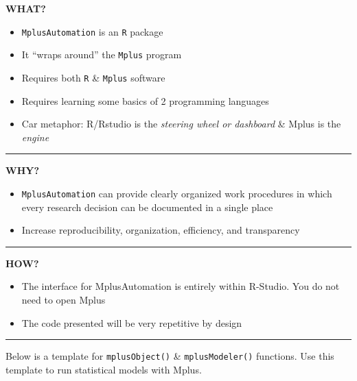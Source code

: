 \documentclass[
]{book}
\providecommand{\tightlist}{%
  \setlength{\itemsep}{0pt}\setlength{\parskip}{0pt}}
\begin{document}
\textbf{WHAT?}

\begin{itemize}
\tightlist
\item
  \texttt{MplusAutomation} is an \texttt{R} package
\item
  It ``wraps around'' the \texttt{Mplus} program
\item
  Requires both \texttt{R} \& \texttt{Mplus} software
\item
  Requires learning some basics of 2 programming languages
\item
  Car metaphor: R/Rstudio is the \emph{steering wheel or dashboard} \& Mplus is the \emph{engine}
\end{itemize}

\begin{center}\rule{0.5\linewidth}{0.5pt}\end{center}

\textbf{WHY?}

\begin{itemize}
\tightlist
\item
  \texttt{MplusAutomation} can provide clearly organized work procedures in which every research decision can be documented in a single place
\item
  Increase reproducibility, organization, efficiency, and transparency
\end{itemize}

\begin{center}\rule{0.5\linewidth}{0.5pt}\end{center}

\textbf{HOW?}

\begin{itemize}
\tightlist
\item
  The interface for MplusAutomation is entirely within R-Studio. You do not need to open Mplus
\item
  The code presented will be very repetitive by design
\end{itemize}

\begin{center}\rule{0.5\linewidth}{0.5pt}\end{center}

Below is a template for \texttt{mplusObject()} \& \texttt{mplusModeler()} functions. Use this template to run statistical models with Mplus.
\end{document}
